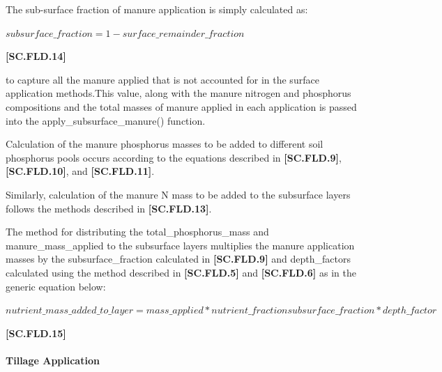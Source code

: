 The sub-surface fraction of manure application is simply calculated as:
            \vspace{0.5cm} 
    
    \begin{center}
        \(subsurface\_fraction =1 - surface\_remainder\_fraction \) 
    \end{center}
        \vspace{0.5cm} 
    
            {\raggedleft \textbf{[SC.FLD.14]}\par}
            \vspace{0.5cm} 

to capture all the manure applied that is not accounted for in the surface application methods.This value, along with the manure nitrogen and phosphorus compositions and the total masses of manure applied in each application is passed into the apply\_subsurface\_manure() function. 

Calculation of the manure phosphorus masses to be added to different soil phosphorus pools occurs according to the equations described in \textbf{[SC.FLD.9]}, \textbf{[SC.FLD.10]}, and \textbf{[SC.FLD.11]}. 

Similarly, calculation of the manure N mass to be added to the subsurface layers follows the methods described in \textbf{[SC.FLD.13]}. 

The method for distributing the total\_phosphorus\_mass and manure\_mass\_applied to the subsurface layers multiplies the manure application masses by the subsurface\_fraction calculated in \textbf{[SC.FLD.9]} and depth\_factors calculated using the method described in \textbf{[SC.FLD.5]} and \textbf{[SC.FLD.6]} as in the generic equation below:
            \vspace{0.5cm} 
    
    \begin{center}
        \(nutrient\_mass\_added\_to\_layer = mass\_applied * nutrient\_fraction
subsurface\_fraction * depth\_factor\) 
    \end{center}
        \vspace{0.5cm} 
    
            {\raggedleft \textbf{[SC.FLD.15]}\par}
            \vspace{0.5cm} 


\paragraph{Tillage Application}
\vspace{-0.25cm}

